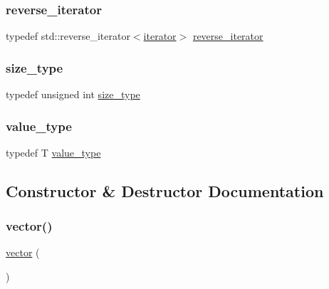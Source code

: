 \subsubsection{\texorpdfstring{reverse\+\_\+iterator}{reverse\_iterator}}
{\footnotesize\ttfamily typedef std\+::reverse\+\_\+iterator$<$\mbox{\hyperlink{classvector_a35c955cacac6aacaa1e82874b1628865}{iterator}}$>$ \mbox{\hyperlink{classvector_a92b881db836646f4039adcbb73c8595f}{reverse\+\_\+iterator}}}

\mbox{\label{classvector_ada51e68d31936547d3729c82daf6b7c6}} 
\subsubsection{\texorpdfstring{size\+\_\+type}{size\_type}}
{\footnotesize\ttfamily typedef unsigned int \mbox{\hyperlink{classvector_ada51e68d31936547d3729c82daf6b7c6}{size\+\_\+type}}}

\mbox{\label{classvector_a265a253612b46abed17c61b0a5e5ce30}} 
\subsubsection{\texorpdfstring{value\+\_\+type}{value\_type}}
{\footnotesize\ttfamily typedef T \mbox{\hyperlink{classvector_a265a253612b46abed17c61b0a5e5ce30}{value\+\_\+type}}}



\subsection{Constructor \& Destructor Documentation}
\mbox{\label{classvector_a19c8e215d2ae3398870702cd06b1564e}} 
\subsubsection{\texorpdfstring{vector()}{vector()}\hspace{0.1cm}{\footnotesize\ttfamily [1/7]}}
{\footnotesize\ttfamily \mbox{\hyperlink{classvector}{vector}} (\begin{DoxyParamCaption}{ }\end{DoxyParamCaption})\hspace{0.3cm}{\ttfamily [noexcept]}}

